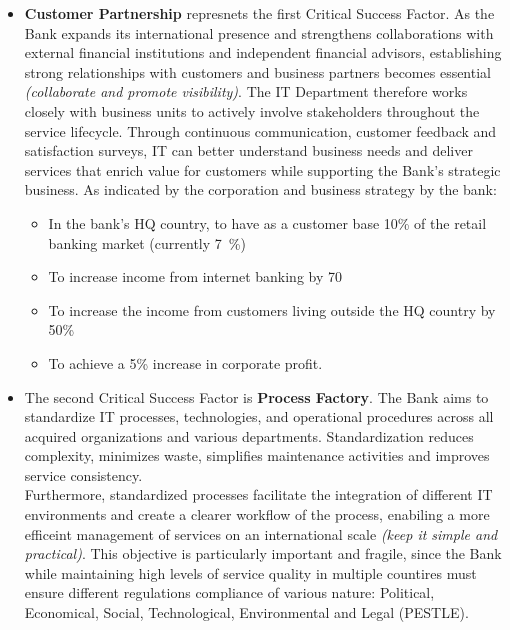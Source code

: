 \begin{itemize}
    \item \textbf{Customer Partnership} represnets the first Critical Success Factor. As the Bank expands its international presence and strengthens collaborations with external financial institutions and independent financial advisors, establishing strong relationships with customers and business partners becomes essential \textit{(collaborate and promote visibility)}. The IT Department therefore works closely with business units to actively involve stakeholders throughout the service lifecycle. Through continuous communication, customer feedback and satisfaction surveys, IT can better understand business needs and deliver services that enrich value for customers while supporting the Bank's strategic business.
    As indicated by the corporation and business strategy by the bank:
    \begin{itemize}
        \item In the bank's HQ country, to have as a customer base 10\% of the retail banking market (currently 7~\%)
        \item To increase income from internet banking by 70%
        \item  To increase the income from customers living outside the HQ country by 50\%
        \item To achieve a 5\% increase in corporate profit.
    \end{itemize}

    \item The second Critical Success Factor is \textbf{Process Factory}. The Bank aims to standardize IT processes, technologies, and operational procedures across all acquired organizations and various departments. Standardization reduces complexity, minimizes waste, simplifies maintenance activities and improves service consistency. \\
    Furthermore, standardized processes facilitate the integration of different IT environments and create a clearer workflow of the process, enabiling a more efficeint management of services on an international scale \textit{(keep it simple and practical)}. 
    This objective is particularly important and fragile, since the Bank while maintaining high levels of service quality in multiple countires must ensure different regulations compliance of various nature: Political, Economical, Social, Technological, Environmental and Legal (PESTLE). 
    

\end{itemize}
